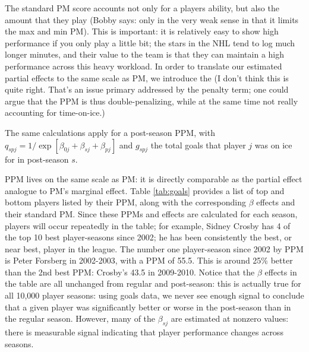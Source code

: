 The standard PM  score accounts not only for a players ability, but also the
amount that they play {\color{red} (Bobby says: only in the very weak sense in
that it limits the max and min PM)}.  This is important: it is relatively easy
to show high performance if you only play a little bit; the stars in the NHL
tend to log much longer minutes, and their value to the team is that they can
maintain a high performance across this heavy workload.  In order to translate
our estimated partial effects to the same scale as PM, we introduce the
{\color{red} (I don't think this is quite right.  That's an issue primary addressed
by the penalty term; one could argue that the PPM is thus double-penalizing, while
at the same time not really accounting for time-on-ice.)}
The same calculations apply for a post-season PPM, with $q_{spj} =
1/\exp[\beta_{0j} + \beta_{sj}+ \beta_{pj}]$ and $g_{spj}$ the total goals
that player $j$ was on ice for in post-season $s$.

PPM lives on the same scale as PM: it is directly comparable as the partial
effect analogue to PM's marginal effect.  Table \ref{tab:goals} provides a
list of top and bottom players listed by their PPM, along with the
corresponding $\beta$ effects and their standard PM.  Since these PPMs and
effects are calculated for each season, players will occur repeatedly in the
table; for example, Sidney Crosby has 4 of the top 10 best player-seasons
since 2002; he has been consistently the best, or near best, player in the
league.  The number one player-season since 2002 by PPM is Peter Forsberg in 2002-2003,
with a PPM of 55.5.  This is around 25\% better than the 2nd best PPM:
Crosby's 43.5 in 2009-2010.  Notice that the $\beta$ effects in the table are
all unchanged from regular and post-season: this is actually true for all
10,000 player seasons: using goals data, we never see enough signal to conclude
that a given player was significantly better or worse in the post-season than
in the regular season.  However, many of the $\beta_{sj}$ are estimated at
nonzero values: there is measurable signal indicating that player performance
changes across seasons.

